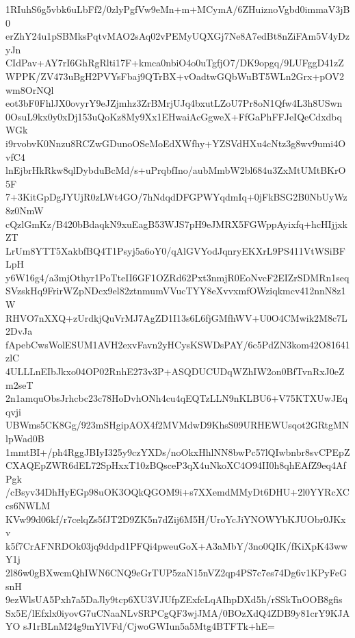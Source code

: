 1RIuhS6g5vbk6uLbFf2/0zlyPgfVw9eMn+m+MCymA/6ZHuiznoVgbd0immaV3jB0
erZhY24u1pSBMksPqtvMAO2sAq02vPEMyUQXGj7Ne8A7edBt8nZiFAm5V4yDzyJn
CIdPav+AY7rI6GhRgRlti17F+kmca0nbiO4o0uTgfjO7/DK9opgq/9LUFggD41zZ
WPPK/ZV473uBgH2PVYsFbaj9QTrBX+vOadtwGQbWuBT5WLn2Grx+pOV2wm8OrNQl
eot3bF0FhlJX0ovyrY9eJZjmhz3ZrBMrjUJq4bxutLZoU7Pr8oN1Qfw4L3h8USwn
0OsuL9kx0y0xDj153uQoKz8My9Xx1EHwaiAcGgweX+FfGaPhFFJeIQeCdxdbqWGk
i9rvobvK0Nnzu8RCZwGDunoOSeMoEdXWfhy+YZSVdHXu4cNtz3g8wv9umi4OvfC4
lnEjbrHkRkw8qlDybduBcMd/s+uPrqbfIno/aubMmbW2bl684u3ZxMtUMtBKrO5F
7+3KitGpDgJYUjR0zLWt4GO/7hNdqdDFGPWYqdmIq+0jFkBSG2B0NbUyWz8z0NmW
cQzlGmKz/B420bBdaqkN9xuEagB53WJS7pH9eJMRX5FGWppAyixfq+hcHIjjxkZT
LrUm8YTT5XakbfBQ4T1Psyj5a6oY0/qAlGVYodJqnryEKXrL9PS411VtWSiBFLpH
y6W16g4/a3mjOthyr1PoTteII6GF1OZRd62Pxt3nmjR0EoNvcF2EIZrSDMRn1seq
SVzskHq9FrirWZpNDcx9el82ztnmumVVucTYY8eXvvxmfOWziqkmcv412nnN8z1W
RHVO7nXXQ+zUrdkjQuVrMJ7AgZD1I13s6L6fjGMfhWV+U0O4CMwik2M8c7L2DvJa
fApebCwsWolESUM1AVH2exvFavn2yHCysKSWDsPAY/6c5PdZN3kom42O81641zlC
4ULLLnEIbJkxo04OP02RnhE273v3P+ASQDUCUDqWZhIW2on0BfTvnRxJ0eZm2seT
2n1amquObsJrhcbc23c78HoDvhONh4cu4qEQTzLLN9nKLBU6+V75KTXUwJEqqvji
UBWms5CK8Gg/923mSHgipAOX4f2MVMdwD9KhsS09URHEWUsqot2GRtgMNlpWad0B
1mmtBI+/ph4RggJBIyI325y9czYXDs/noOkxHhlNN8bwPc57lQIwbnbr8svCPEpZ
CXAQEpZWR6dEL72SpHxxT10zBQsceP3qX4uNkoXC4O94II0h8qhEAfZ9eq4AfPgk
/cBsyv34DhHyEGp98uOK3OQkQGOM9i+s7XXemdMMyDt6DHU+2l0YYRcXCcs6NWLM
KVw99d06kf/r7celqZs5fJT2D9ZK5n7dZij6M5H/UroYcJiYNOWYbKJUObr0JKxv
k5f7CrAFNRDOk03jq9ddpd1PFQi4pweuGoX+A3aMbY/3no0QIK/fKiXpK43wwY1j
2l86w0gBXwcmQhIWN6CNQ9eGrTUP5zaN15nVZ2qp4PS7c7es74Dg6v1KPyFeGsnH
9ezWlsUA5Pxh7a5DaJly9tcp6XU3VJUfpZExfcLqAIhpDXd5h/rSSkTnOOB8gfis
Sx5E/lEfxlx0iyovG7uCNaaNLvSRPCgQF3wjJMA/0BOzXdQ4ZDB9y81crY9KJAYO
sJ1rBLnM24g9mYlVFd/CjwoGWIun5a5Mtg4BTFTk+hE=
